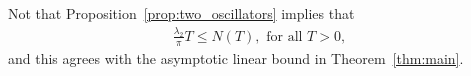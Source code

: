 \documentclass[final ]{IEEEtran}
\newtheorem{theorem}{Theorem}
\newcommand {\R}{\mathbb R}
\begin{document}
 
Not that  Proposition~\ref{prop:two_oscillators} implies that 
    \begin{align*} 
        \frac{\lambda_2 }{\pi}T\leq N(T),  \text{ for all } T>0,
    \end{align*}
  and this agrees with the asymptotic 
  linear bound  in Theorem~\ref{thm:main}.
 

\end{document}
